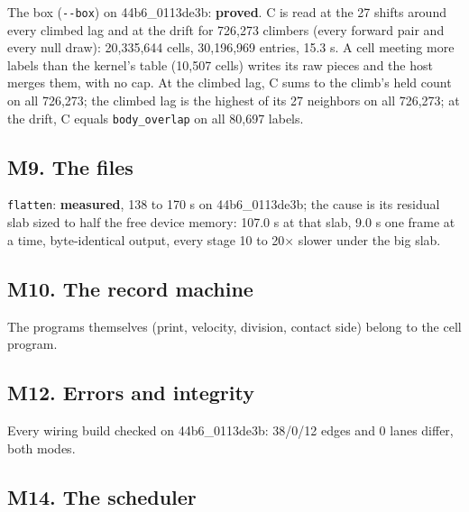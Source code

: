 The box (\texttt{-\allowbreak{}-\allowbreak{}box}) on 44b6\_\allowbreak{}0113de3b: \textbf{proved}. C is read at the 27 shifts around every climbed lag and at the drift for 726,273 climbers (every forward pair and every null draw): 20,335,644 cells, 30,196,969 entries, 15.3 s. A cell meeting more labels than the kernel's table (10,507 cells) writes its raw pieces and the host merges them, with no cap. At the climbed lag, C sums to the climb's held count on all 726,273; the climbed lag is the highest of its 27 neighbors on all 726,273; at the drift, C equals \texttt{body\_\allowbreak{}overlap} on all 80,697 labels.

\subsection{\texorpdfstring{M9. The files}{M9. The files}}

\texttt{flatten}: \textbf{measured}, 138 to 170 s on 44b6\_\allowbreak{}0113de3b; the cause is its residual slab sized to half the free device memory: 107.0 s at that slab, 9.0 s one frame at a time, byte-identical output, every stage 10 to 20× slower under the big slab.

\subsection{\texorpdfstring{M10. The record machine}{M10. The record machine}}

The programs themselves (print, velocity, division, contact side) belong to the cell program.

\subsection{\texorpdfstring{M12. Errors and integrity}{M12. Errors and integrity}}

Every wiring build checked on 44b6\_\allowbreak{}0113de3b: 38/0/12 edges and 0 lanes differ, both modes.

\subsection{\texorpdfstring{M14. The scheduler}{M14. The scheduler}}

